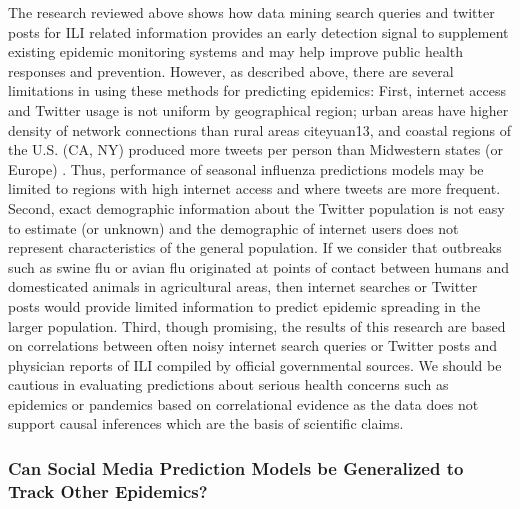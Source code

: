 \documentclass[sigconf]{acmart}
\begin{document}
The research reviewed above shows how data mining search queries and twitter posts for 
ILI related information provides an early detection signal to supplement existing epidemic 
monitoring systems and may help improve public health responses and prevention. However, 
as described above, there are several limitations in using these methods for predicting 
epidemics: First, internet access and Twitter usage is not uniform by geographical region; 
urban areas have higher density of network connections than rural areas cite{yuan13}, and 
coastal regions of the U.S. (CA, NY) produced more tweets per person than Midwestern states 
(or Europe) \cite{achrekar12}. Thus, performance of seasonal influenza predictions models 
may be limited to regions with high internet access and where tweets are more frequent. 
Second, exact demographic information about the Twitter population is not easy to estimate 
(or unknown) and the demographic of internet users does not represent characteristics of 
the general population. If we consider that outbreaks such as swine flu or avian flu 
originated at points of contact between humans and domesticated animals in agricultural 
areas, then internet searches or Twitter posts would provide limited information to predict 
epidemic spreading in the larger population. Third, though promising, the results of this 
research are based on correlations between often noisy internet search queries or Twitter 
posts and physician reports of ILI compiled by official governmental sources. We should be 
cautious in evaluating predictions about serious health concerns such as epidemics or 
pandemics based on correlational evidence as the data does not support causal inferences 
which are the basis of scientific claims. 

 
\subsubsection{Can Social Media Prediction Models be Generalized to Track Other Epidemics?}







 
\end{document}
